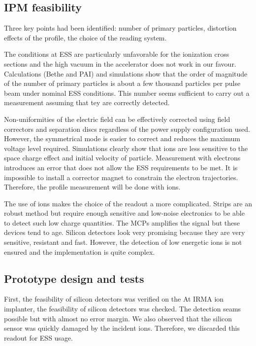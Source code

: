 \begin{refsection}
  \subsection{IPM feasibility}
  Three key points had been identified: number of primary particles, distortion effects of the profile, the choice of the reading system.

  The conditions at ESS are particularly unfavorable for the ionization cross sections and the high vacuum in the accelerator does not work in our favour. Calculations (Bethe and PAI) and simulations show that the order of magnitude of the number of primary particles is about a few thousand particles per pulse beam under nominal ESS conditions. This number seems sufficient to carry out a measurement assuming that tey are correctly detected.

  Non-uniformities of the electric field can be effectively corrected using field correctors and separation discs regardless of the power supply configuration used. However, the symmetrical mode is easier to correct and reduces the maximum voltage level required.
  Simulations clearly show that ions are less sensitive to the space charge effect and initial velocity of particle. Measurement with electrons introduces an error that does not allow the ESS requirements to be met. It is impossible to install a corrector magnet to constrain the electron trajectories. Therefore, the profile measurement will be done with ions.

  The use of ions makes the choice of the readout a more complicated. Strips are an robust method but require enough sensitive and low-noise electronics to be able to detect such low charge quantities.
  The MCPs amplifies the signal but these devices tend to age. Silicon detectors look very promising because they are very sensitive, resistant and fast. However, the detection of low energetic ions is not ensured and the implementation is quite complex.

  \subsection{Prototype design and tests}
  First, the feasibility of silicon detectors was verified on the
  At IRMA ion implanter, the feasibility of silicon detectors was checked. 
  The detection seams possible but with almost no error margin. We also observed that the silicon sensor was quickly damaged by the incident ions. Therefore, we discarded this readout for ESS usage.
  

\end{refsection}
